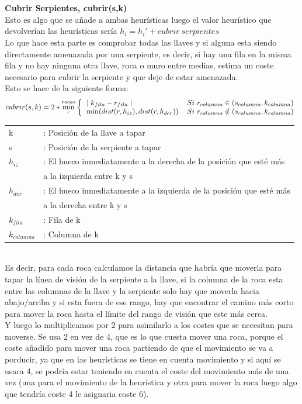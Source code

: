 \documentclass[11pt,spanish]{article}
\begin{document}
			\\
			\\
			\textbf{Cubrir Serpientes, cubrir(s,k)}\\
			Esto es algo que se añade a ambas heurísticas luego el valor heurístico que devolverían las heurísticas sería $h_i = h_i'+cubrir\ serpientes$\\
			Lo que hace esta parte es comprobar todas las llaves y si alguna esta siendo directamente amenazada por una serpiente, es decir, si hay una fila en la misma fila y no hay ninguna otra llave, roca o muro entre medias, estima un coste necesario para cubrir la serpiente y que deje de estar amenazada.\\
			Esto se hace de la siguiente forma:
			\[
				cubrir(s,k) = 2*\min\limits_r^{rocas}
				\bigg \{
				\begin{tabular}{ll}
					$\mid k_{fila}-r_{fila} \mid $& $Si\ r_{columna} \in (s_{columna}, k_{columna})$\\
					$\min(dist(r,h_{iz}),dist(r,h_{der}))$&$ Si\ r_{columna} \notin (s_{columna}, k_{columna})$\\
				\end{tabular}
			\]
			\begin{tabular}{ll}
				k&: Posición de la llave a tapar\\
				s&: Posición de la serpiente a tapar\\
				$h_{iz}$&: El hueco inmediatamente a la derecha de la posición que esté más \\
				&  a la izquierda entre k y s\\
				$h_{der}$&: El hueco inmediatamente a la izquierda de la posición que esté más \\
				&  a la derecha entre k y s\\
				$k_{fila}$&: Fila de k\\
				$k_{columna}$&: Columna de k
			\end{tabular}\\
			Es decir, para cada roca calculamos la distancia que habría que moverla para tapar la línea de visión de la serpiente a la llave, si la columna de la roca esta entre las columnas de la llave y la serpiente solo hay que moverla hacia abajo/arriba y si esta fuera de ese rango, hay que encontrar el camino más corto para mover la roca hasta el límite del rango de visión que este más cerca.\\
			Y luego lo multiplicamos por 2 para asimilarlo a los costes que se necesitan para moverse. Se usa 2 en vez de 4, que es lo que cuesta mover una roca, porque el coste añadido para mover una roca partiendo de que el movimiento se va a porducir, ya que en las heurísticas se tiene en cuenta movimiento y si aquí se usara 4, se podría estar teniendo en cuenta el coste del movimiento más de una vez (una para el movimiento de la heurística y otra para mover la roca luego algo que tendría coste 4 le asignaria coste 6).\\
\end{document}
